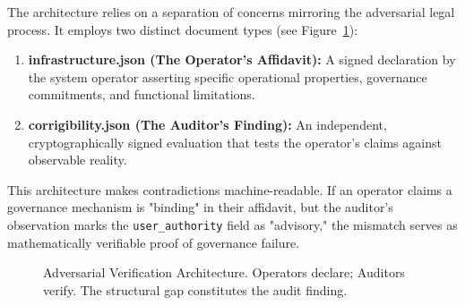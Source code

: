 \documentclass{article}
\begin{document}
The architecture relies on a separation of concerns mirroring the adversarial legal process. It employs two distinct document types (see Figure~\ref{fig:manifests}):

\begin{enumerate}
    \item \textbf{infrastructure.json (The Operator's Affidavit):} A signed declaration by the system operator asserting specific operational properties, governance commitments, and functional limitations.
    \item \textbf{corrigibility.json (The Auditor's Finding):} An independent, cryptographically signed evaluation that tests the operator's claims against observable reality.
\end{enumerate}

This architecture makes contradictions machine-readable. If an operator claims a governance mechanism is "binding" in their affidavit, but the auditor's observation marks the \texttt{user\_authority} field as "advisory," the mismatch serves as mathematically verifiable proof of governance failure.

\begin{figure}[htbp]
\centering
{}
\caption{Adversarial Verification Architecture. Operators declare; Auditors verify. The structural gap constitutes the audit finding.}
\label{fig:manifests}
\end{figure}
\end{document}
